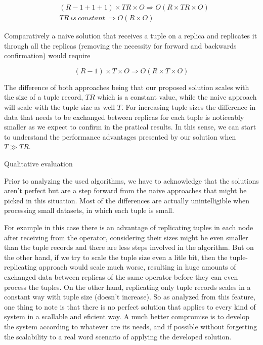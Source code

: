 \documentclass[times, 10pt,twocolumn]{article}
\begin{document}
\begin{eqnarray*}
 &(R - 1 + 1 + 1) \times TR \times O \Rightarrow O(R \times TR \times O) \\
 &TR\ is\ constant\ \Rightarrow O(R \times O) 
\end{eqnarray*}

Comparatively a naive solution that receives a tuple on a replica and
replicates it through all the replicas (removing the necessity for forward
and backwards confirmation) would require 

\[ (R-1)\times T \times O \Rightarrow O(R \times T \times O)\]

The difference of both approaches being that our proposed solution scales
with the size of a tuple record, $TR$ which is a constant
value, while the naive approach will scale with the tuple size as well
$T$. For increasing tuple sizes the difference in data that needs to be
exchanged between replicas for each tuple is noticeably smaller as we
expect to confirm in the pratical results. In this sense, we can start 
to understand the performance advantages presented by our
solution when $T \gg TR$.




Qualitative evaluation


Prior to analyzing the used algorithms, we have to acknowledge that the
solutions aren't perfect but are a step forward from the naive approaches
that might be picked in this situation. Most of the differences are
actually unintelligible when processing small datasets, in which each
tuple is small. 

For example in this case there is an advantage of replicating tuples in
each node after receiving from the operator, considering their sizes might
be even smaller than the tuple records and there are less steps involved
in the algorithm. But on the other hand, if we try to scale the tuple size
even a litle bit, then the tuple-replicating approach would scale much
worse, resulting in huge amounts of exchanged data between replicas of the
same operator before they can even process the tuples. On the other hand,
replicating only tuple records scales in a constant way with tuple size
(doesn't increase).  So as analyzed from this feature, one thing to note
is that there is no perfect solution that applies to every kind of system
in a scallable and eficient way.  A much better compromise is to develop
the system according to whatever are its needs, and if possible without
forgetting the scalability to a real word scenario of applying the
developed solution.
\end{document}
